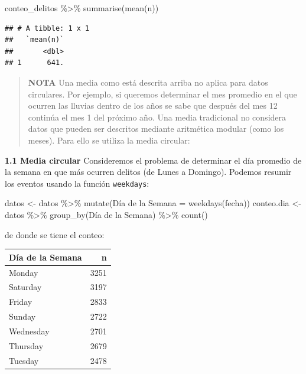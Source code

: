 \documentclass[
]{book}
\newenvironment{Shaded}{\begin{snugshade}}{\end{snugshade}}
\newcommand{\AttributeTok}[1]{\textcolor[rgb]{0.77,0.63,0.00}{#1}}
\newcommand{\FunctionTok}[1]{\textcolor[rgb]{0.00,0.00,0.00}{#1}}
\newcommand{\NormalTok}[1]{#1}
\newcommand{\OtherTok}[1]{\textcolor[rgb]{0.56,0.35,0.01}{#1}}
\newcommand{\SpecialCharTok}[1]{\textcolor[rgb]{0.00,0.00,0.00}{#1}}
\newcommand{\StringTok}[1]{\textcolor[rgb]{0.31,0.60,0.02}{#1}}
\begin{document}
\begin{Shaded}
\begin{Highlighting}[]
\NormalTok{conteo\_delitos }\SpecialCharTok{\%\textgreater{}\%} \FunctionTok{summarise}\NormalTok{(}\FunctionTok{mean}\NormalTok{(n))}
\end{Highlighting}
\end{Shaded}

\begin{verbatim}
## # A tibble: 1 x 1
##   `mean(n)`
##       <dbl>
## 1      641.
\end{verbatim}

\begin{quote}
\textbf{NOTA} Una media como está descrita arriba no aplica para datos circulares. Por ejemplo, si queremos determinar el mes promedio en el que ocurren las lluvias dentro de los años se sabe que después del mes 12 continúa el mes 1 del próximo año. Una media tradicional no considera datos que pueden ser descritos mediante aritmética modular (como los meses). Para ello se utiliza la media circular:
\end{quote}

\textbf{1.1 Media circular} Consideremos el problema de determinar el día promedio de la semana en que más ocurren delitos (de Lunes a Domingo). Podemos resumir los eventos usando la función \texttt{weekdays}:

\begin{Shaded}
\begin{Highlighting}[]
\NormalTok{datos      }\OtherTok{\textless{}{-}}\NormalTok{ datos }\SpecialCharTok{\%\textgreater{}\%} \FunctionTok{mutate}\NormalTok{(}\StringTok{\textasciigrave{}}\AttributeTok{Día de la Semana}\StringTok{\textasciigrave{}} \OtherTok{=} \FunctionTok{weekdays}\NormalTok{(fecha))}
\NormalTok{conteo.dia }\OtherTok{\textless{}{-}}\NormalTok{ datos }\SpecialCharTok{\%\textgreater{}\%} \FunctionTok{group\_by}\NormalTok{(}\StringTok{\textasciigrave{}}\AttributeTok{Día de la Semana}\StringTok{\textasciigrave{}}\NormalTok{) }\SpecialCharTok{\%\textgreater{}\%} \FunctionTok{count}\NormalTok{()}
\end{Highlighting}
\end{Shaded}

de donde se tiene el conteo:

\begin{tabular}{lr}
\toprule
Día de la Semana & n\\
\midrule
Monday & 3251\\
Saturday & 3197\\
Friday & 2833\\
Sunday & 2722\\
Wednesday & 2701\\
\addlinespace
Thursday & 2679\\
Tuesday & 2478\\
\bottomrule
\end{tabular}
\end{document}
